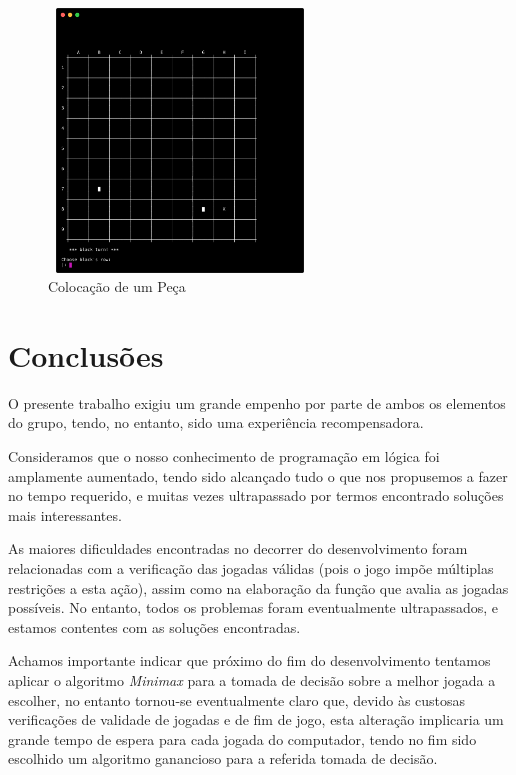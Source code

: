 \documentclass[a4paper]{article}
\begin{document}
\begin{figure}[h!]
\begin{center}
\includegraphics[height=7cm,width=7cm]{images/fabrik_set_piece.png}
\caption{Colocação de um Peça}
\label{Figura 1}
\end{center}
\end{figure}

\clearpage
\newpage
\newpage

\section{Conclusões}
O presente trabalho exigiu um grande empenho por parte de ambos os elementos do grupo, tendo, no entanto, sido uma experiência recompensadora.

Consideramos que o nosso conhecimento de programação em lógica foi amplamente aumentado, tendo sido alcançado tudo o que nos propusemos a fazer no tempo requerido, e muitas vezes ultrapassado por termos encontrado soluções mais interessantes.

As maiores dificuldades encontradas no decorrer do desenvolvimento foram relacionadas com a verificação das jogadas válidas (pois o jogo impõe múltiplas restrições a esta ação), assim como na elaboração da função que avalia as jogadas possíveis. No entanto, todos os problemas foram eventualmente ultrapassados, e estamos contentes com as soluções encontradas.

Achamos importante indicar que próximo do fim do desenvolvimento tentamos aplicar o algoritmo \textit{Minimax} para a tomada de decisão sobre a melhor jogada a escolher, no entanto tornou-se eventualmente claro que, devido às custosas verificações de validade de jogadas e de fim de jogo, esta alteração implicaria um grande tempo de espera para cada jogada do computador, tendo no fim sido escolhido um algoritmo ganancioso para a referida tomada de decisão.
\end{document}
